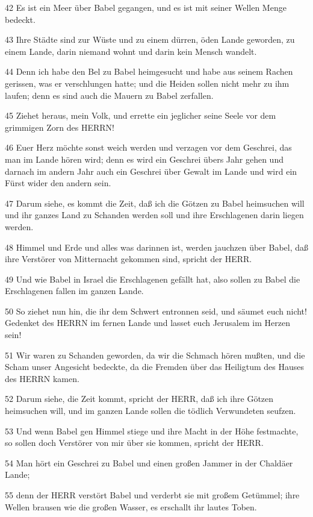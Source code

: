 \par 42 Es ist ein Meer über Babel gegangen, und es ist mit seiner Wellen Menge bedeckt.
\par 43 Ihre Städte sind zur Wüste und zu einem dürren, öden Lande geworden, zu einem Lande, darin niemand wohnt und darin kein Mensch wandelt.
\par 44 Denn ich habe den Bel zu Babel heimgesucht und habe aus seinem Rachen gerissen, was er verschlungen hatte; und die Heiden sollen nicht mehr zu ihm laufen; denn es sind auch die Mauern zu Babel zerfallen.
\par 45 Ziehet heraus, mein Volk, und errette ein jeglicher seine Seele vor dem grimmigen Zorn des HERRN!
\par 46 Euer Herz möchte sonst weich werden und verzagen vor dem Geschrei, das man im Lande hören wird; denn es wird ein Geschrei übers Jahr gehen und darnach im andern Jahr auch ein Geschrei über Gewalt im Lande und wird ein Fürst wider den andern sein.
\par 47 Darum siehe, es kommt die Zeit, daß ich die Götzen zu Babel heimsuchen will und ihr ganzes Land zu Schanden werden soll und ihre Erschlagenen darin liegen werden.
\par 48 Himmel und Erde und alles was darinnen ist, werden jauchzen über Babel, daß ihre Verstörer von Mitternacht gekommen sind, spricht der HERR.
\par 49 Und wie Babel in Israel die Erschlagenen gefällt hat, also sollen zu Babel die Erschlagenen fallen im ganzen Lande.
\par 50 So ziehet nun hin, die ihr dem Schwert entronnen seid, und säumet euch nicht! Gedenket des HERRN im fernen Lande und lasset euch Jerusalem im Herzen sein!
\par 51 Wir waren zu Schanden geworden, da wir die Schmach hören mußten, und die Scham unser Angesicht bedeckte, da die Fremden über das Heiligtum des Hauses des HERRN kamen.
\par 52 Darum siehe, die Zeit kommt, spricht der HERR, daß ich ihre Götzen heimsuchen will, und im ganzen Lande sollen die tödlich Verwundeten seufzen.
\par 53 Und wenn Babel gen Himmel stiege und ihre Macht in der Höhe festmachte, so sollen doch Verstörer von mir über sie kommen, spricht der HERR.
\par 54 Man hört ein Geschrei zu Babel und einen großen Jammer in der Chaldäer Lande;
\par 55 denn der HERR verstört Babel und verderbt sie mit großem Getümmel; ihre Wellen brausen wie die großen Wasser, es erschallt ihr lautes Toben.
